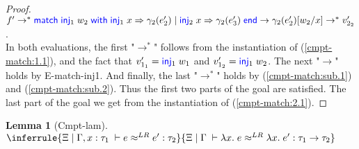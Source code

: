 \documentclass[twoside,11pt,openright]{report}
\newtheorem{lemma}[theorem]{Lemma}
\theoremstyle{definition}
\newcommand{\Keyword}[1]{{\color{blue} \mathsf{#1}}}
\newcommand{\var}{x}
\newcommand{\expr}{e}
\newcommand{\val}{v}
\newcommand{\valB}{w}
\newcommand{\Inj}[1]{\Keyword{inj}_{#1}\;}
\newcommand{\MatchCmd}{\Keyword{match}}
\newcommand{\WithCmd}{\Keyword{with}}
\newcommand{\EndCmd}{\Keyword{end}}
\def\Match#1with#2=>#3|#4=>#5end{\MatchCmd{}\;#1\;\WithCmd{}\;#2\Rightarrow#3 \;|\;#4\Rightarrow#5\;\EndCmd{}}
\newcommand{\subst}[3]{#1{\left[#3 \middle/ #2 \right]}}
\newcommand{\Tfunc}[2]{#1 \rightarrow #2}
\newcommand{\typ}{\tau}
\newcommand{\venv}{\Gamma}
\newcommand{\tenv}{\Xi}
\newcommand{\jdgRel}[6]{#1 \; | \; #2 \; \vdash #3 \approx^{#4} #5 : #6}
\newcommand{\step}{\rightarrow}
\newcommand{\stepS}{\rightarrow^*}
\newcommand{\LogRel}[5]{\jdgRel{#1}{#2}{#3}{LR}{#4}{#5}}
\begin{document}
\begin{proof}
  $f' \stepS \Match \Inj{1} \valB_2 with \Inj{1} \var => \gamma_2(\expr'_2) | \Inj{2} \var => \gamma_2(\expr'_3) end \step \subst{\gamma_2(\expr'_2)}{\var}{\valB_2} \stepS \val'_{2_2}$.\\
  In both evaluations, the first "$\stepS$" follows from the instantiation of (\ref*{cmpt-match:1.1}), and the fact that $\val'_{1_1} = \Inj{1} \valB_1$ and $\val'_{1_2} = \Inj{1} \valB_2$. The next "$\step$" holds by E-match-inj1. And finally, the last "$\stepS$" holds by (\ref*{cmpt-match:sub.1}) and (\ref*{cmpt-match:sub.2}).
  Thus the first two parts of the goal are satisfied. The last part of the goal we get from the instantiation of (\ref*{cmpt-match:2.1}).
\end{proof}


\begin{lemma}[Cmpt-lam]
  $\inferrule
  { \LogRel{\tenv}{\venv, x : \typ_1}{\expr}{\expr'}{\typ_2} }
  { \LogRel{\tenv}{\venv}{\fun \var . \expr}{\fun \var . \expr'}{\Tfunc{\typ_1}{\typ_2}} }$
\end{lemma}
\end{document}
